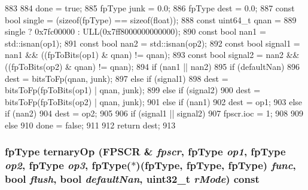 \begin{DoxyCode}
883 {
884     done = true;
885     fpType junk = 0.0;
886     fpType dest = 0.0;
887     const bool single = (sizeof(fpType) == sizeof(float));
888     const uint64_t qnan =
889         single ? 0x7fc00000 : ULL(0x7ff8000000000000);
890     const bool nan1 = std::isnan(op1);
891     const bool nan2 = std::isnan(op2);
892     const bool signal1 = nan1 && ((fpToBits(op1) & qnan) != qnan);
893     const bool signal2 = nan2 && ((fpToBits(op2) & qnan) != qnan);
894     if (nan1 || nan2) {
895         if (defaultNan) {
896             dest = bitsToFp(qnan, junk);
897         }  else if (signal1) {
898             dest = bitsToFp(fpToBits(op1) | qnan, junk);
899         } else if (signal2) {
900             dest = bitsToFp(fpToBits(op2) | qnan, junk);
901         } else if (nan1) {
902             dest = op1;
903         } else if (nan2) {
904             dest = op2;
905         }
906         if (signal1 || signal2) {
907             fpscr.ioc = 1;
908         }
909     } else {
910         done = false;
911     }
912     return dest;
913 }
\end{DoxyCode}
\hypertarget{classArmISA_1_1FpOp_a90767d472cab7e40d318351bf1aa8c12}{
\subsubsection[{ternaryOp}]{\setlength{\rightskip}{0pt plus 5cm}fpType ternaryOp (FPSCR \& {\em fpscr}, \/  fpType {\em op1}, \/  fpType {\em op2}, \/  fpType {\em op3}, \/  fpType($\ast$)(fpType, fpType, fpType) {\em func}, \/  bool {\em flush}, \/  bool {\em defaultNan}, \/  {\bf uint32\_\-t} {\em rMode}) const}}
\label{classArmISA_1_1FpOp_a90767d472cab7e40d318351bf1aa8c12}



